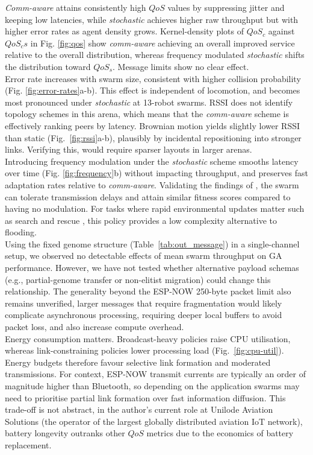 \documentclass[conference]{IEEEtran}
\begin{document}
\emph{Comm-aware} attains consistently high $QoS$ values by suppressing jitter and keeping low latencies, while \emph{stochastic} achieves higher raw throughput but with higher error rates as agent density grows. Kernel-density plots of $QoS_c$ against $QoS_cs$ in Fig. \ref{fig:qos} show \emph{comm-aware} achieving an overall improved service relative to the overall distribution, whereas frequency modulated \emph{stochastic} shifts the distribution toward $QoS_s$. Message limits show no clear effect. \\

Error rate increases with swarm size, consistent with higher collision probability (Fig. \ref{fig:error-rates}a-b). This effect is independent of locomotion, and becomes most pronounced under \emph{stochastic} at 13-robot swarms. RSSI does not identify topology schemes in this arena, which means that the \emph{comm-aware} scheme is effectively ranking peers by latency. Brownian motion yields slightly lower RSSI than static (Fig.~\ref{fig:rssi}a-b), plausibly by incidental repositioning into stronger links. Verifying this, would require sparser layouts in larger arenas. \\

Introducing frequency modulation under the \emph{stochastic} scheme smooths latency over time (Fig. \ref{fig:frequency}b) without impacting throughput, and preserves fast adaptation rates relative to \emph{comm-aware}. Validating the findings of \cite{tsianos_impact_2012}, the swarm can tolerate transmission delays and attain similar fitness scores compared to having no modulation. For tasks where rapid environmental updates matter such as search and rescue \cite{perrin_decentralised_2012}, this policy provides a low complexity alternative to flooding. \\

Using the fixed genome structure (Table~\ref{tab:out_message}) in a single-channel setup, we observed no detectable effects of mean swarm throughput on GA performance. However, we have not tested whether alternative payload schemas (e.g., partial-genome transfer or non-elitist migration) could change this relationship. The generality beyond the ESP-NOW 250-byte packet limit also remains unverified, larger messages that require fragmentation would likely complicate asynchronous processing, requiring deeper local buffers to avoid packet loss, and also increase compute overhead. \\

Energy consumption matters. Broadcast-heavy policies raise CPU utilisation, whereas link-constraining policies lower processing load (Fig.~\ref{fig:cpu-util}). Energy budgets therefore favour selective link formation and moderated transmissions. For context, ESP-NOW transmit currents are typically an order of magnitude higher than Bluetooth, so depending on the application swarms may need to prioritise partial link formation over fast information diffusion. This trade-off is not abstract, in the author's current role at Unilode Aviation Solutions (the operator of the largest globally distributed aviation IoT network), battery longevity outranks other $QoS$ metrics due to the economics of battery replacement. \\
\end{document}
